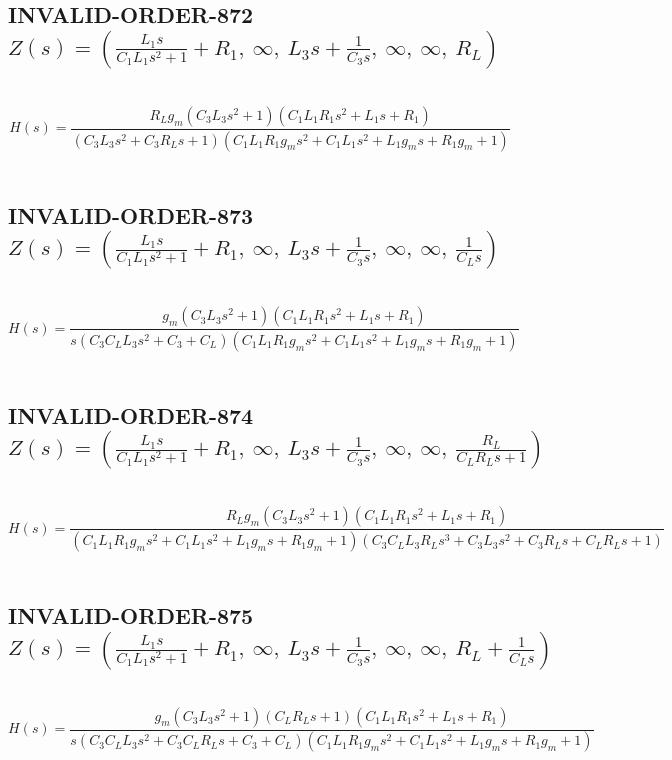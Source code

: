 \documentclass{article}
\begin{document}
\subsection{INVALID-ORDER-872 $Z(s) = \left( \frac{L_{1} s}{C_{1} L_{1} s^{2} + 1} + R_{1}, \  \infty, \  L_{3} s + \frac{1}{C_{3} s}, \  \infty, \  \infty, \  R_{L}\right)$ } \ 
\textbf{\[H(s) = \frac{R_{L} g_{m} \left(C_{3} L_{3} s^{2} + 1\right) \left(C_{1} L_{1} R_{1} s^{2} + L_{1} s + R_{1}\right)}{\left(C_{3} L_{3} s^{2} + C_{3} R_{L} s + 1\right) \left(C_{1} L_{1} R_{1} g_{m} s^{2} + C_{1} L_{1} s^{2} + L_{1} g_{m} s + R_{1} g_{m} + 1\right)}\] } \ 
\subsection{INVALID-ORDER-873 $Z(s) = \left( \frac{L_{1} s}{C_{1} L_{1} s^{2} + 1} + R_{1}, \  \infty, \  L_{3} s + \frac{1}{C_{3} s}, \  \infty, \  \infty, \  \frac{1}{C_{L} s}\right)$ } \ 
\textbf{\[H(s) = \frac{g_{m} \left(C_{3} L_{3} s^{2} + 1\right) \left(C_{1} L_{1} R_{1} s^{2} + L_{1} s + R_{1}\right)}{s \left(C_{3} C_{L} L_{3} s^{2} + C_{3} + C_{L}\right) \left(C_{1} L_{1} R_{1} g_{m} s^{2} + C_{1} L_{1} s^{2} + L_{1} g_{m} s + R_{1} g_{m} + 1\right)}\] } \ 
\subsection{INVALID-ORDER-874 $Z(s) = \left( \frac{L_{1} s}{C_{1} L_{1} s^{2} + 1} + R_{1}, \  \infty, \  L_{3} s + \frac{1}{C_{3} s}, \  \infty, \  \infty, \  \frac{R_{L}}{C_{L} R_{L} s + 1}\right)$ } \ 
\textbf{\[H(s) = \frac{R_{L} g_{m} \left(C_{3} L_{3} s^{2} + 1\right) \left(C_{1} L_{1} R_{1} s^{2} + L_{1} s + R_{1}\right)}{\left(C_{1} L_{1} R_{1} g_{m} s^{2} + C_{1} L_{1} s^{2} + L_{1} g_{m} s + R_{1} g_{m} + 1\right) \left(C_{3} C_{L} L_{3} R_{L} s^{3} + C_{3} L_{3} s^{2} + C_{3} R_{L} s + C_{L} R_{L} s + 1\right)}\] } \ 
\subsection{INVALID-ORDER-875 $Z(s) = \left( \frac{L_{1} s}{C_{1} L_{1} s^{2} + 1} + R_{1}, \  \infty, \  L_{3} s + \frac{1}{C_{3} s}, \  \infty, \  \infty, \  R_{L} + \frac{1}{C_{L} s}\right)$ } \ 
\textbf{\[H(s) = \frac{g_{m} \left(C_{3} L_{3} s^{2} + 1\right) \left(C_{L} R_{L} s + 1\right) \left(C_{1} L_{1} R_{1} s^{2} + L_{1} s + R_{1}\right)}{s \left(C_{3} C_{L} L_{3} s^{2} + C_{3} C_{L} R_{L} s + C_{3} + C_{L}\right) \left(C_{1} L_{1} R_{1} g_{m} s^{2} + C_{1} L_{1} s^{2} + L_{1} g_{m} s + R_{1} g_{m} + 1\right)}\] } \ 
\end{document}
